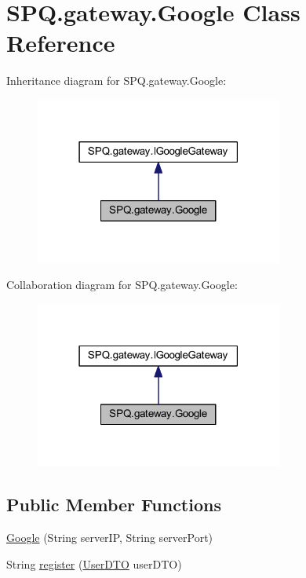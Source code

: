 \hypertarget{class_s_p_q_1_1gateway_1_1_google}{}\section{S\+P\+Q.\+gateway.\+Google Class Reference}
\label{class_s_p_q_1_1gateway_1_1_google}


Inheritance diagram for S\+P\+Q.\+gateway.\+Google\+:
\nopagebreak
\begin{figure}[H]
\begin{center}
\leavevmode
\includegraphics[width=231pt]{class_s_p_q_1_1gateway_1_1_google__inherit__graph}
\end{center}
\end{figure}


Collaboration diagram for S\+P\+Q.\+gateway.\+Google\+:
\nopagebreak
\begin{figure}[H]
\begin{center}
\leavevmode
\includegraphics[width=231pt]{class_s_p_q_1_1gateway_1_1_google__coll__graph}
\end{center}
\end{figure}
\subsection*{Public Member Functions}
\begin{DoxyCompactItemize}
\item 
\mbox{\hyperlink{class_s_p_q_1_1gateway_1_1_google_a8b232ea9ca746c4500b6c02e86b76fef}{Google}} (String server\+IP, String server\+Port)
\item 
String \mbox{\hyperlink{class_s_p_q_1_1gateway_1_1_google_ab287ce4fd789224c45be6037a99a937b}{register}} (\mbox{\hyperlink{class_s_p_q_1_1dto_1_1_user_d_t_o}{User\+D\+TO}} user\+D\+TO)
\end{DoxyCompactItemize}


